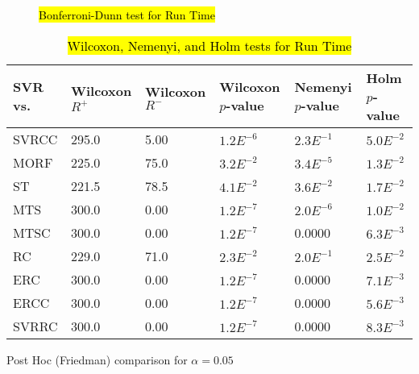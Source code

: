 \documentclass[preprint,12pt]{elsarticle}
\begin{document}
{\begin{figure}[h!]
{}
\caption{\hl{Bonferroni-Dunn test for Run Time}}
\label{fig:BonfDunnTime}
\end{figure}
\vspace{-1.7em}
\begin{table}[H]
\centering
\caption{\hl{Wilcoxon, Nemenyi, and Holm tests for Run Time}}\label{tab:stattime}
\scriptsize
\begin{threeparttable}
\begin{tabularx}{0.6\textwidth}{p{1cm}p{1cm}p{1cm}p{1cm}p{1cm}p{0.9cm}}
\toprule
SVR vs. & Wilcoxon $R^{+}$ & Wilcoxon $R^{-}$ & Wilcoxon $p$-value & Nemenyi $p$-value & Holm $p$-value \\ 
\midrule 
SVRCC & 295.0 & 5.00 & $1.2E^{-6}$ &  $2.3E^{-1}$ & $5.0E^{-2}$\\ 
MORF & 225.0 & 75.0 & $3.2E^{-2}$ &  $3.4E^{-5}$ & $1.3E^{-2}$\\  
ST & 221.5 & 78.5 & $4.1E^{-2}$ &  $3.6E^{-2}$ & $1.7E^{-2}$\\   
MTS & 300.0 & 0.00 & $1.2E^{-7}$ &  $2.0E^{-6}$ & $1.0E^{-2}$\\ 
MTSC & 300.0 & 0.00 & $1.2E^{-7}$ &  0.0000 & $6.3E^{-3}$\\
RC & 229.0 & 71.0 & $2.3E^{-2}$ &  $2.0E^{-1}$ & $2.5E^{-2}$ \\  
ERC & 300.0 & 0.00 & $1.2E^{-7}$ & 0.0000 & $7.1E^{-3}$\\  
ERCC & 300.0 & 0.00 & $1.2E^{-7}$ & 0.0000 & $5.6E^{-3}$\\ 
SVRRC & 300.0 & 0.00 & $1.2E^{-7}$ &  0.0000 & $8.3E^{-3}$\\ 
\bottomrule
\end{tabularx}
\begin{tablenotes}
\item Post Hoc (Friedman) comparison for $\alpha = 0.05$
\end{tablenotes}
\end{threeparttable}
\end{table}}
\end{document}

